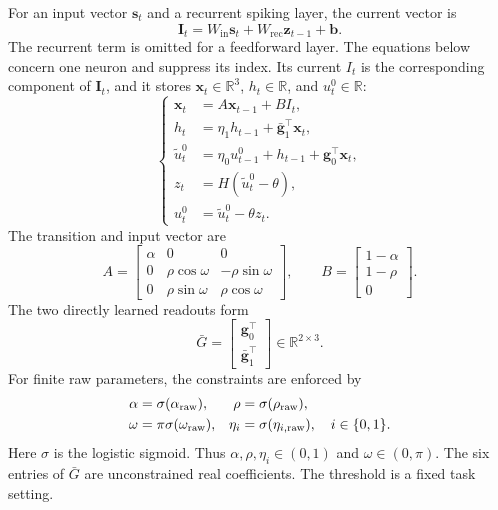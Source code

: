 \documentclass[letterpaper,journal]{IEEEtran}
\newcommand{\R}{\mathbb{R}}
\begin{document}
For an input vector $\mathbf{s}_t$ and a recurrent spiking layer, the current vector is
\begin{equation}
\mathbf I_t=W_{\mathrm{in}}\mathbf s_t+
W_{\mathrm{rec}}\mathbf z_{t-1}+\mathbf b.
\label{eq:current}
\end{equation}
The recurrent term is omitted for a feedforward layer. The equations below concern one neuron and suppress its index. Its current $I_t$ is the corresponding component of $\mathbf I_t$, and it stores $\mathbf x_t\in\R^3$, $h_t\in\R$, and $u_t^0\in\R$:
\begin{equation}
\left\{
\begin{aligned}
\mathbf x_t&=A\mathbf x_{t-1}+BI_t,\\
h_t&=\eta_1h_{t-1}+\bar{\mathbf g}_1^\top\mathbf x_t,\\
\widetilde u_t^0&=\eta_0u_{t-1}^0+h_{t-1}
                    +\mathbf g_0^\top\mathbf x_t,\\
z_t&=H(\widetilde u_t^0-\theta),\\
u_t^0&=\widetilde u_t^0-\theta z_t.
\end{aligned}
\right.
\label{eq:sprif}
\end{equation}
The transition and input vector are
\begin{equation}
A=\begin{bmatrix}
\alpha&0&0\\
0&\rho\cos\omega&-\rho\sin\omega\\
0&\rho\sin\omega&\rho\cos\omega
\end{bmatrix},
\qquad
B=\begin{bmatrix}1-\alpha\\1-\rho\\0\end{bmatrix}.
\label{eq:AB}
\end{equation}
The two directly learned readouts form
\begin{equation}
\bar G=
\begin{bmatrix}\mathbf g_0^\top\\\bar{\mathbf g}_1^\top\end{bmatrix}
\in\R^{2\times3}.
\label{eq:G}
\end{equation}
For finite raw parameters, the constraints are enforced by
\begin{equation}
\begin{aligned}
\alpha&=\sigma(\alpha_{\rm raw}),&
\rho&=\sigma(\rho_{\rm raw}),\\
\omega&=\pi\sigma(\omega_{\rm raw}),&
\eta_i&=\sigma(\eta_{i,{\rm raw}}),\quad i\in\{0,1\}.
\end{aligned}
\label{eq:constraints}
\end{equation}
Here $\sigma$ is the logistic sigmoid. Thus $\alpha,\rho,\eta_i\in(0,1)$ and $\omega\in(0,\pi)$. The six entries of $\bar G$ are unconstrained real coefficients. The threshold is a fixed task setting.
\end{document}
